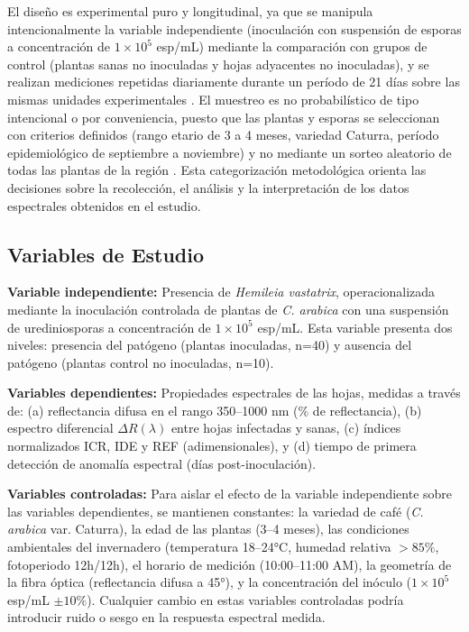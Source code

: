 \documentclass[12pt, a4paper]{article}
\begin{document}
	El diseño es experimental puro y longitudinal, ya que se manipula intencionalmente la variable independiente (inoculación con suspensión de esporas a concentración de $1 \times 10^5$ esp/mL) mediante la comparación con grupos de control (plantas sanas no inoculadas y hojas adyacentes no inoculadas), y se realizan mediciones repetidas diariamente durante un período de 21 días sobre las mismas unidades experimentales \parencite{sampieri2014}. El muestreo es no probabilístico de tipo intencional o por conveniencia, puesto que las plantas y esporas se seleccionan con criterios definidos (rango etario de 3 a 4 meses, variedad Caturra, período epidemiológico de septiembre a noviembre) y no mediante un sorteo aleatorio de todas las plantas de la región \parencite{sampieri2014}. Esta categorización metodológica orienta las decisiones sobre la recolección, el análisis y la interpretación de los datos espectrales obtenidos en el estudio.
	
	\subsection{Variables de Estudio}
	
	\textbf{Variable independiente:} Presencia de \textit{Hemileia vastatrix}, operacionalizada mediante la inoculación controlada de plantas de \textit{C. arabica} con una suspensión de urediniosporas a concentración de $1 \times 10^5$ esp/mL. Esta variable presenta dos niveles: presencia del patógeno (plantas inoculadas, n=40) y ausencia del patógeno (plantas control no inoculadas, n=10).
	
	\textbf{Variables dependientes:} Propiedades espectrales de las hojas, medidas a través de: (a) reflectancia difusa en el rango 350--1000 nm (\% de reflectancia), (b) espectro diferencial $\Delta R(\lambda)$ entre hojas infectadas y sanas, (c) índices normalizados ICR, IDE y REF (adimensionales), y (d) tiempo de primera detección de anomalía espectral (días post-inoculación).
	
	\textbf{Variables controladas:} Para aislar el efecto de la variable independiente sobre las variables dependientes, se mantienen constantes: la variedad de café (\textit{C. arabica} var. Caturra), la edad de las plantas (3--4 meses), las condiciones ambientales del invernadero (temperatura 18--24°C, humedad relativa $>85\%$, fotoperiodo 12h/12h), el horario de medición (10:00--11:00 AM), la geometría de la fibra óptica (reflectancia difusa a 45°), y la concentración del inóculo ($1 \times 10^5$ esp/mL $\pm 10\%$). Cualquier cambio en estas variables controladas podría introducir ruido o sesgo en la respuesta espectral medida.
	
\end{document}
